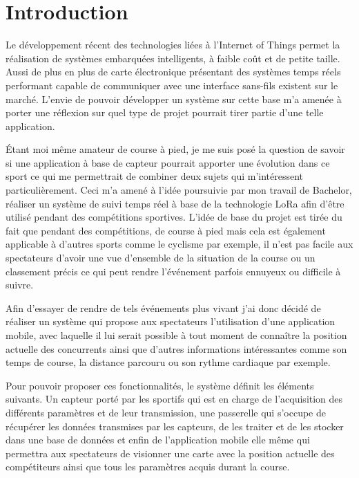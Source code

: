 \chapter{Introduction}

Le développement récent des technologies liées à l'Internet of Things permet la réalisation de systèmes embarquées intelligents, à faible coût et de petite taille. Aussi de plus en plus de carte électronique présentant des systèmes temps réels performant capable de communiquer avec une interface sans-fils existent sur le marché. L'envie de pouvoir développer un système sur cette base m'a amenée à porter une réflexion sur quel type de projet pourrait tirer partie d'une telle application. 

Étant moi même amateur de course à pied, je me suis posé la question de savoir si une application à base de capteur pourrait apporter une évolution dans ce sport ce qui me permettrait de combiner deux sujets qui m'intéressent particulièrement. Ceci m'a amené à l'idée poursuivie par mon travail de Bachelor, réaliser un système de suivi temps réel à base de la technologie LoRa afin d'être utilisé pendant des compétitions sportives. L'idée de base du projet est tirée du fait que pendant des compétitions, de course à pied mais cela est également applicable à d'autres sports comme le cyclisme par exemple, il n'est pas facile aux spectateurs d'avoir une vue d'ensemble de la situation de la course ou un classement précis ce qui peut rendre l'événement parfois ennuyeux ou difficile à suivre.

Afin d'essayer de rendre de tels événements plus vivant j'ai donc décidé de réaliser un système qui propose aux spectateurs l'utilisation d'une application mobile, avec laquelle il lui serait possible à tout moment de connaître la position actuelle des concurrents ainsi que d'autres informations intéressantes comme son temps de course, la distance parcouru ou son rythme cardiaque par exemple. 

Pour pouvoir proposer ces fonctionnalités, le système définit les éléments suivants. Un capteur porté par les sportifs qui est en charge de l'acquisition des différents paramètres et de leur transmission, une passerelle qui s'occupe de récupérer les données transmises par les capteurs, de les traiter et de les stocker dans une base de données et enfin de l'application mobile elle même qui permettra aux spectateurs de visionner une carte avec la position actuelle des compétiteurs ainsi que tous les paramètres acquis durant la course.

